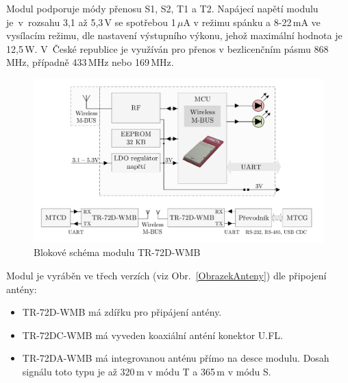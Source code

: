 Modul podporuje módy přenosu S1, S2, T1 a T2. Napájecí napětí modulu je~v~rozsahu 3,1 až 5,3\,V se spotřebou 1\,$\mu$A v režimu spánku a 8-22\,mA ve vysílacím režimu, dle nastavení výstupního výkonu, jehož maximální hodnota je 12,5\,W.
V~České republice je využíván pro přenos v bezlicenčním pásmu 868\,MHz, případně 433\,MHz nebo 169\,MHz.\newline

\newpage

 \begin{figure}[!ht]
	\vspace{-20pt}
  \begin{center}
    \includegraphics[scale=0.6]{obrazky/modul_block}
  \end{center}
	\vspace{-30pt}
  \caption{Blokové schéma modulu TR-72D-WMB \cite{ModulIQRF}}
	\label{BlokovkaIQRF}
	\vspace{-5pt}
\end{figure}

Modul je vyráběn ve třech verzích (viz Obr.~\ref{ObrazekAnteny}) dle připojení antény:
\begin{itemize}
		\item TR-72D-WMB má zdířku pro připájení antény.
		\item TR-72DC-WMB	má vyveden koaxiální anténí konektor U.FL. 
		\item TR-72DA-WMB má integrovanou anténu přímo na desce modulu. Dosah signálu toto typu je až 320\,m v módu T a 365\,m v módu S.
\end{itemize}

